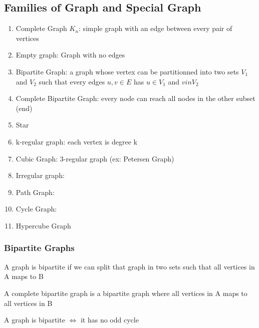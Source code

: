\documentclass{article}
\begin{document}
\subsection{Families of Graph and Special Graph}%
\label{sub:Families of Graph and Special Graph}

\begin{enumerate}
    \item Complete Graph $K_n$: simple graph with an edge between every
	pair of vertices
    \item Empty graph: Graph with no edges
    \item Bipartite Graph: a graph whose vertex can be partitionned into
	two sets $V_1$ and $V_2$ such that every edges $ u,v \in E$ has
	$u \in V_1$ and $v in V_2$
    \item Complete Bipartite Graph: every node can reach all nodes in
	the other subset (end)
    \item Star
    \item k-regular graph: each vertex is degree k
    \item Cubic Graph: 3-regular graph (ex: Petersen Graph)
    \item Irregular graph:
    \item Path Graph:
    \item Cycle Graph:
    \item Hypercube Graph
\end{enumerate}

\subsubsection{Bipartite Graphs}%
\label{sub:Bipartite Graphs}

\begin{definition}
    A graph is bipartite if we can split that graph in two sets such that
    all vertices in A maps to B
\end{definition}

\begin{definition}
    A complete bipartite graph is a bipartite graph where all vertices in
    A maps to all vertices in B
\end{definition}

\begin{theorem}
    A graph is bipartite $\Longleftrightarrow$ it has no odd cycle
\end{theorem}
\end{document}

